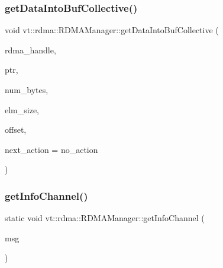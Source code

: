 \subsubsection{\texorpdfstring{get\+Data\+Into\+Buf\+Collective()}{getDataIntoBufCollective()}}
{\footnotesize\ttfamily void vt\+::rdma\+::\+R\+D\+M\+A\+Manager\+::get\+Data\+Into\+Buf\+Collective (\begin{DoxyParamCaption}\item[{\hyperlink{namespacevt_a10442579ec4e7ebef223818e64bcf908}{R\+D\+M\+A\+\_\+\+Handle\+Type} const \&}]{rdma\+\_\+handle,  }\item[{\hyperlink{namespacevt_a9e2c953286c7616f7c218e9951790776}{R\+D\+M\+A\+\_\+\+Ptr\+Type} const \&}]{ptr,  }\item[{\hyperlink{namespacevt_aab8d55968084610ce3b17057981e9300}{Byte\+Type} const \&}]{num\+\_\+bytes,  }\item[{\hyperlink{namespacevt_aab8d55968084610ce3b17057981e9300}{Byte\+Type} const \&}]{elm\+\_\+size,  }\item[{\hyperlink{namespacevt_aab8d55968084610ce3b17057981e9300}{Byte\+Type} const \&}]{offset,  }\item[{\hyperlink{namespacevt_ae0a5a7b18cc99d7b732cb4d44f46b0f3}{Action\+Type}}]{next\+\_\+action = {\ttfamily no\+\_\+action} }\end{DoxyParamCaption})}

\mbox{\label{structvt_1_1rdma_1_1_r_d_m_a_manager_a7e01a11f17c52dee2d564341866e2e29}} 
\subsubsection{\texorpdfstring{get\+Info\+Channel()}{getInfoChannel()}}
{\footnotesize\ttfamily static void vt\+::rdma\+::\+R\+D\+M\+A\+Manager\+::get\+Info\+Channel (\begin{DoxyParamCaption}\item[{\hyperlink{structvt_1_1rdma_1_1_get_info_channel}{Get\+Info\+Channel} $\ast$}]{msg }\end{DoxyParamCaption})\hspace{0.3cm}{\ttfamily [static]}}

\mbox{\label{structvt_1_1rdma_1_1_r_d_m_a_manager_aba5002562451e1264979003dcf1e659e}} 
